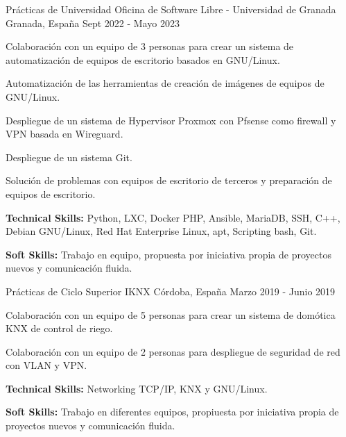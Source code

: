 

\begin{cventries}

  \cventry
    {Prácticas de Universidad} %
    {Oficina de Software Libre - Universidad de Granada} %
    {Granada, España} %
    {Sept 2022 - Mayo 2023} %
    {
      \begin{cvitems} %
        \item {Colaboración con un equipo de 3 personas para crear un sistema de automatización de equipos de escritorio basados en GNU/Linux.}
        \item {Automatización de las herramientas de creación de imágenes de equipos de GNU/Linux.}
        \item {Despliegue de un sistema de Hypervisor Proxmox con Pfsense como firewall y VPN basada en Wireguard.}
        \item {Despliegue de un sistema Git.}
        \item {Solución de problemas con equipos de escritorio de terceros y preparación de equipos de escritorio.}
        \item {\textbf{Technical Skills:} Python, LXC, Docker PHP, Ansible, MariaDB, SSH, C++, Debian GNU/Linux, Red Hat Enterprise Linux, apt, Scripting bash, Git.}
        \item {\textbf{Soft Skills:} Trabajo en equipo, propuesta por iniciativa propia de proyectos nuevos y comunicación fluida.}
      \end{cvitems}
    }
    
  \cventry
    {Prácticas de Ciclo Superior} %
    {IKNX} %
    {Córdoba, España} %
    {Marzo 2019 - Junio 2019} %
    {
      \begin{cvitems} %
        \item {Colaboración con un equipo de 5 personas para crear un sistema de domótica KNX de control de riego.}
        \item {Colaboración con un equipo de 2 personas para despliegue de seguridad de red con VLAN y VPN.}
        \item {\textbf{Technical Skills:} Networking TCP/IP, KNX y GNU/Linux.}
        \item {\textbf{Soft Skills:} Trabajo en diferentes equipos, propiuesta por iniciativa propia de proyectos nuevos y comunicación fluida.}
      \end{cvitems}
    }

\end{cventries}
